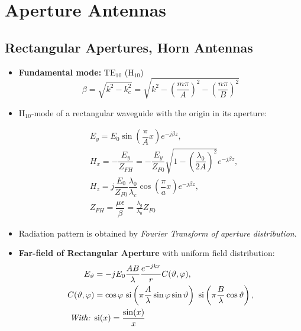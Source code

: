 \section{Aperture Antennas}
\subsection{Rectangular Apertures, Horn Antennas}
\begin{itemize}
    \itemsep0pt
    \item \textbf{Fundamental mode:} $\mathrm{TE}_{10}$ ($\mathrm{H_{10}}$)
        \begin{equation*}
            \beta = \sqrt{k^2 - k_c^2} = \sqrt{k^2 -\left(\dfrac{m\pi}{A}\right)^2 -\left(\dfrac{n\pi}{B}\right)^2}
        \end{equation*}
    \item $\mathrm{H}_{10}$-mode of a rectangular waveguide with the origin in its aperture:
        \begin{center}
            
        \end{center}
        \begin{align*}
            &E_y = E_0 \sin\left(\dfrac{\pi}{A}x\right) e^{-j\beta z},\\
            &H_x = -\dfrac{E_y}{Z_{FH}} = -\dfrac{E_y}{Z_{F0}} \sqrt{1 - \left(\dfrac{\lambda_0}{2A}\right)^2} e^{-j\beta z},\\
            &H_z = j \dfrac{E_0}{Z_{F0}} \dfrac{\lambda_0}{\lambda_c} \cos\left(\dfrac{\pi}{a}x\right) e^{-j\beta z},\\
            &Z_{FH} = \dfrac{\mu\epsilon}{\beta} = \frac{\lambda_g}{\lambda_0} Z_{F0}
        \end{align*}
    \item Radiation pattern is obtained by \textit{Fourier Transform of aperture distribution}.
    \item \textbf{Far-field of Rectangular Aperture} with uniform field distribution:
        \begin{align*}
            E_{\vartheta} &= -jE_0 \dfrac{AB}{\lambda} \dfrac{e^{-jkr}}{r} C(\vartheta, \varphi),\\
            C(\vartheta, \varphi) &= \cos\varphi\
            \mathrm{si}\left(\pi \dfrac{A}{\lambda}\sin\varphi\sin\vartheta\right)\
            \mathrm{si}\left(\pi \dfrac{B}{\lambda}\cos\vartheta\right),\\
            \text{\textit{With: }}&\mathrm{si}(x) = \dfrac{\sin(x)}{x}
        \end{align*}

\end{itemize}
